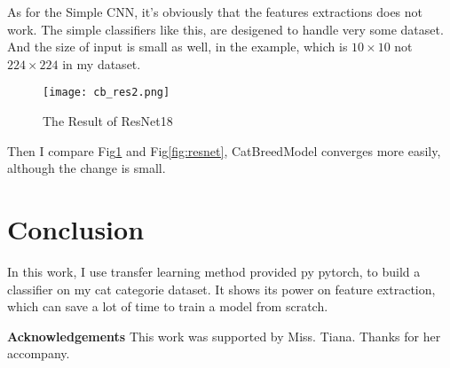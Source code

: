 \documentclass[12pt]{article}
\begin{document}
As for the Simple CNN, it's obviously that the features extractions does not work.
The simple classifiers like this, are desigened to handle very some dataset.
And the size of input is small as well, in the example, which is $10 \times 10$ not $224 \times 224$ in my dataset.

\begin{figure}[h]
    \centering
    \texttt{[image: cb\_res2.png]}
    \caption{The Result of ResNet18}
    \label{fig:resnet18_result}
\end{figure}

Then I compare Fig\ref{fig:resnet18_result} and Fig\ref{fig:resnet},
CatBreedModel converges more easily, although the change is small. 
\section{Conclusion}

In this work, I use transfer learning method provided py pytorch, to build 
a classifier on my cat categorie dataset. It shows its power on feature extraction,
which can save a lot of time to train a model from scratch.

\textbf{Acknowledgements} This work was supported by Miss. Tiana. Thanks for her accompany.

\printbibliography
\end{document}
